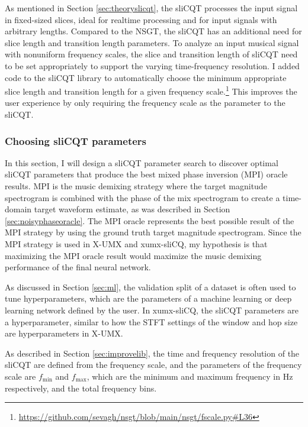 \documentclass[report.tex]{subfiles}
\begin{document}
As mentioned in Section \ref{sec:theoryslicqt}, the sliCQT processes the input signal in fixed-sized slices, ideal for realtime processing and for input signals with arbitrary lengths. Compared to the NSGT, the sliCQT has an additional need for slice length and transition length parameters. To analyze an input musical signal with nonuniform frequency scales, the slice and transition length of sliCQT need to be set appropriately to support the varying time-frequency resolution. I added code to the sliCQT library to automatically choose the minimum appropriate slice length and transition length for a given frequency scale.\footnote{\url{https://github.com/sevagh/nsgt/blob/main/nsgt/fscale.py\#L36}} This improves the user experience by only requiring the frequency scale as the parameter to the sliCQT.

\subsubsection{Choosing sliCQT parameters}
\label{sec:slicqparamsrch}

In this section, I will design a sliCQT parameter search to discover optimal sliCQT parameters that produce the best mixed phase inversion (MPI) oracle results. MPI is the music demixing strategy where the target magnitude spectrogram is combined with the phase of the mix spectrogram to create a time-domain target waveform estimate, as was described in Section \ref{sec:noisyphaseoracle}. The MPI oracle represents the best possible result of the MPI strategy by using the ground truth target magnitude spectrogram. Since the MPI strategy is used in X-UMX and xumx-sliCQ, my hypothesis is that maximizing the MPI oracle result would maximize the music demixing performance of the final neural network.

As discussed in Section \ref{sec:ml}, the validation split of a dataset is often used to tune hyperparameters, which are the parameters of a machine learning or deep learning network defined by the user. In xumx-sliCQ, the sliCQT parameters are a hyperparameter, similar to how the STFT settings of the window and hop size are hyperparameters in X-UMX.

As described in Section \ref{sec:improvelib}, the time and frequency resolution of the sliCQT are defined from the frequency scale, and the parameters of the frequency scale are $f_{\text{min}}$ and $f_{\text{max}}$, which are the minimum and maximum frequency in Hz respectively, and the total frequency bins.
\end{document}
